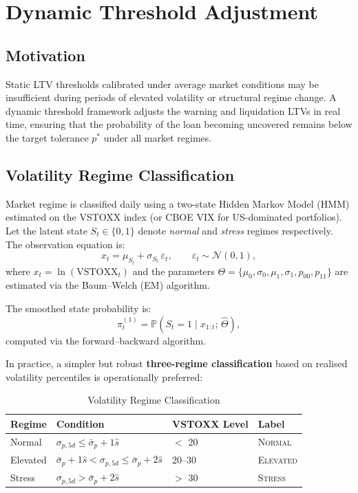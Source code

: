 \documentclass[12pt, a4paper]{article}
\newcommand{\Prob}{\mathbb{P}}
\newcommand{\1}{\mathbbm{1}}
\begin{document}
\section{Dynamic Threshold Adjustment}
\label{sec:dynamic}

\subsection{Motivation}

Static LTV thresholds calibrated under average market conditions may be
insufficient during periods of elevated volatility or structural regime change.
A dynamic threshold framework adjusts the warning and liquidation LTVs in
real time, ensuring that the probability of the loan becoming uncovered remains
below the target tolerance $p^*$ under all market regimes.

\subsection{Volatility Regime Classification}
\label{subsec:regime}

Market regime is classified daily using a two-state Hidden Markov Model (HMM)
estimated on the VSTOXX index (or CBOE VIX for US-dominated portfolios).
Let the latent state $S_t \in \{0, 1\}$ denote \emph{normal} and \emph{stress}
regimes respectively. The observation equation is:
\[
x_t = \mu_{S_t} + \sigma_{S_t}\,\varepsilon_t, \qquad \varepsilon_t \sim \mathcal{N}(0,1),
\]
where $x_t = \ln(\text{VSTOXX}_t)$ and the parameters
$\Theta = \{\mu_0, \sigma_0, \mu_1, \sigma_1, p_{00}, p_{11}\}$ are estimated
via the Baum--Welch (EM) algorithm.

The smoothed state probability is:
\[
\pi_t^{(1)} = \Prob(S_t = 1 \mid x_{1:t};\,\hat{\Theta}),
\]
computed via the forward--backward algorithm.

In practice, a simpler but robust \textbf{three-regime classification} based on
realised volatility percentiles is operationally preferred:

\begin{table}[H]
\centering
\caption{Volatility Regime Classification}
\label{tab:regime}
\begin{tabular}{llll}
\toprule
\textbf{Regime} & \textbf{Condition} & \textbf{VSTOXX Level} & \textbf{Label} \\
\midrule
Normal  & $\sigma_{p,5d} \leq \bar{\sigma}_p + 1\hat{s}$ & $<$ 20 & \textsc{Normal} \\
Elevated & $\bar{\sigma}_p + 1\hat{s} < \sigma_{p,5d} \leq \bar{\sigma}_p + 2\hat{s}$ & 20--30 & \textsc{Elevated} \\
Stress  & $\sigma_{p,5d} > \bar{\sigma}_p + 2\hat{s}$ & $>$ 30 & \textsc{Stress} \\
\bottomrule
\end{tabular}
\end{table}
\end{document}
